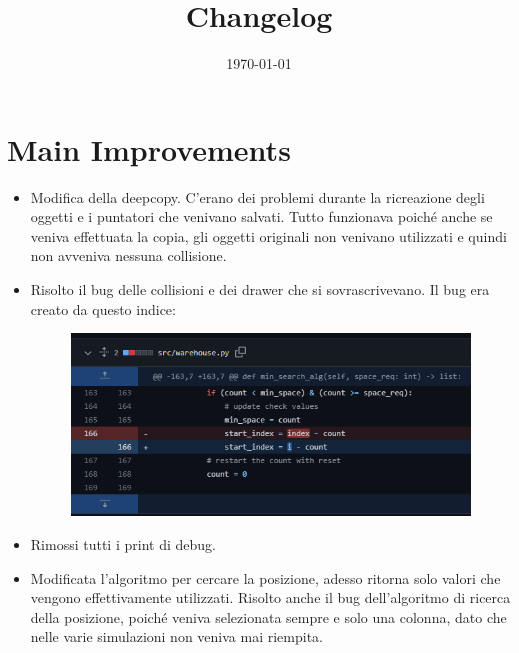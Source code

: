 \documentclass[a4paper]{article}
\begin{document}
	\title{Changelog}
	\date{\today}
	\maketitle
	
	\newpage
	
	\section*{Main Improvements}
	\begin{itemize}[label=]
		\item Modifica della \textsf{deepcopy}. C'erano dei problemi durante la ricreazione degli oggetti e i puntatori che venivano salvati. Tutto funzionava poiché anche se veniva effettuata la copia, gli oggetti originali non venivano utilizzati e quindi non avveniva nessuna collisione.
		
		\item Risolto il bug delle collisioni e dei drawer che si sovrascrivevano. Il bug era creato da questo indice:
		\begin{figure}[tph!]
			\centering
			\includegraphics[width=\textwidth]{img/screenshot001}
			\label{fig:screenshot001}
		\end{figure}
		
		\item Rimossi tutti i print di debug.
		
		\item Modificata l'algoritmo per cercare la posizione, adesso ritorna solo valori che vengono effettivamente utilizzati. Risolto anche il bug dell'algoritmo di ricerca della posizione, poiché veniva selezionata sempre e solo una colonna, dato che nelle varie simulazioni non veniva mai riempita.
		

\end{itemize}
\end{document}
